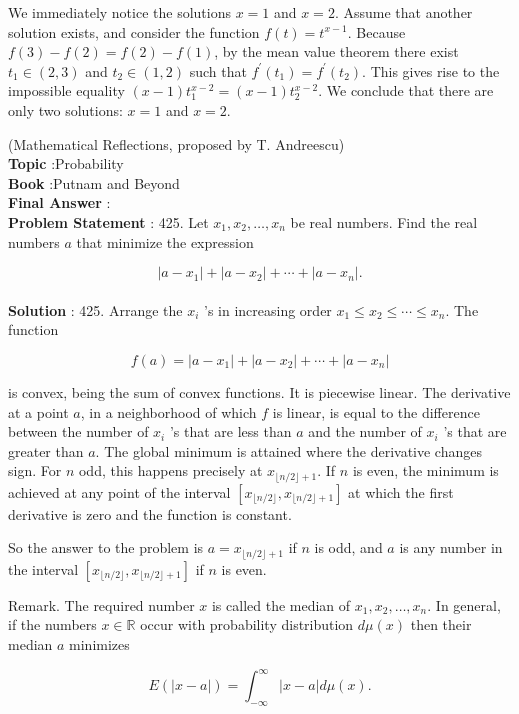\documentclass[10pt]{article}
\begin{document}
We immediately notice the solutions $x=1$ and $x=2$. Assume that another solution exists, and consider the function $f(t)=t^{x-1}$. Because $f(3)-f(2)=f(2)-f(1)$, by the mean value theorem there exist $t_{1} \in(2,3)$ and $t_{2} \in(1,2)$ such that $f^{\prime}\left(t_{1}\right)=f^{\prime}\left(t_{2}\right)$. This gives rise to the impossible equality $(x-1) t_{1}^{x-2}=(x-1) t_{2}^{x-2}$. We conclude that there are only two solutions: $x=1$ and $x=2$.

(Mathematical Reflections, proposed by T. Andreescu) 
\\
\textbf{Topic} :Probability\\
\textbf{Book} :Putnam and Beyond\\
\textbf{Final Answer} :\\


\textbf{Problem Statement} :
425. Let $x_{1}, x_{2}, \ldots, x_{n}$ be real numbers. Find the real numbers $a$ that minimize the expression

$$
\left|a-x_{1}\right|+\left|a-x_{2}\right|+\cdots+\left|a-x_{n}\right| .
$$
\\
\textbf{Solution} :
425. Arrange the $x_{i}$ 's in increasing order $x_{1} \leq x_{2} \leq \cdots \leq x_{n}$. The function

$$
f(a)=\left|a-x_{1}\right|+\left|a-x_{2}\right|+\cdots+\left|a-x_{n}\right|
$$

is convex, being the sum of convex functions. It is piecewise linear. The derivative at a point $a$, in a neighborhood of which $f$ is linear, is equal to the difference between the number of $x_{i}$ 's that are less than $a$ and the number of $x_{i}$ 's that are greater than $a$. The global minimum is attained where the derivative changes sign. For $n$ odd, this happens precisely at $x_{\lfloor n / 2\rfloor+1}$. If $n$ is even, the minimum is achieved at any point of the interval $\left[x_{\lfloor n / 2\rfloor}, x_{\lfloor n / 2\rfloor+1}\right]$ at which the first derivative is zero and the function is constant.

So the answer to the problem is $a=x_{\lfloor n / 2\rfloor+1}$ if $n$ is odd, and $a$ is any number in the interval $\left[x_{\lfloor n / 2\rfloor}, x_{\lfloor n / 2\rfloor+1}\right]$ if $n$ is even.

Remark. The required number $x$ is called the median of $x_{1}, x_{2}, \ldots, x_{n}$. In general, if the numbers $x \in \mathbb{R}$ occur with probability distribution $d \mu(x)$ then their median $a$ minimizes

$$
E(|x-a|)=\int_{-\infty}^{\infty}|x-a| d \mu(x) .
$$
\end{document}
